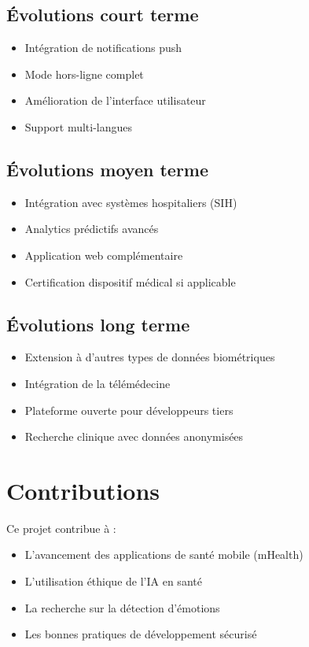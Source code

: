 \documentclass[a4paper,11pt]{report}
\begin{document}
\subsection{Évolutions court terme}

\begin{itemize}
    \item Intégration de notifications push
    \item Mode hors-ligne complet
    \item Amélioration de l'interface utilisateur
    \item Support multi-langues
\end{itemize}

\subsection{Évolutions moyen terme}

\begin{itemize}
    \item Intégration avec systèmes hospitaliers (SIH)
    \item Analytics prédictifs avancés
    \item Application web complémentaire
    \item Certification dispositif médical si applicable
\end{itemize}

\subsection{Évolutions long terme}

\begin{itemize}
    \item Extension à d'autres types de données biométriques
    \item Intégration de la télémédecine
    \item Plateforme ouverte pour développeurs tiers
    \item Recherche clinique avec données anonymisées
\end{itemize}

\section{Contributions}

Ce projet contribue à :

\begin{itemize}
    \item L'avancement des applications de santé mobile (mHealth)
    \item L'utilisation éthique de l'IA en santé
    \item La recherche sur la détection d'émotions
    \item Les bonnes pratiques de développement sécurisé
\end{itemize}
\end{document}
